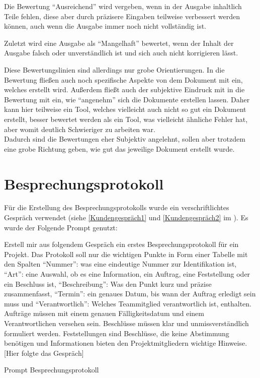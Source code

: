 Die Bewertung ``Ausreichend'' wird vergeben, wenn in der Ausgabe inhaltlich Teile fehlen, diese aber durch präzisere Eingaben 
teilweise verbessert werden können, auch wenn die Ausgabe immer noch nicht vollständig ist.

Zuletzt wird eine Ausgabe als ``Mangelhaft'' bewertet, wenn der Inhalt der Ausgabe falsch oder unverständlich ist und sich 
auch nicht korrigieren lässt.

Diese Bewertungslinien sind allerdings nur grobe Orientierungen. In die Bewertung fließen auch noch spezifische 
Aspekte von dem Dokument mit ein, welches erstellt wird. Außerdem fließt auch der subjektive Eindruck mit in die 
Bewertung mit ein, wie ``angenehm'' sich die Dokumente erstellen lassen. Daher kann hier teilweise ein Tool, welches 
vielleicht auch nicht so gut ein Dokument erstellt, besser bewertet werden als ein Tool, was vielleicht ähnliche 
Fehler hat, aber womit deutlich Schwieriger zu arbeiten war.\\
Dadurch sind die Bewertungen eher Subjektiv angelehnt, sollen aber trotzdem eine grobe Richtung geben, wie gut das 
jeweilige Dokument erstellt wurde.


\section{Besprechungsprotokoll}  \label{CompBesprechungsprotokoll}

Für die Erstellung des Besprechungsprotokolls wurde ein verschriftlichtes Gespräch verwendet 
(siehe \autoref{Kundengespräch1} und \autoref{Kundengespräch2} im ). Es wurde der Folgende Prompt 
genutzt:

\begin{prompt}[H]
    \begin{tcolorbox}[colback=gray!20, colframe=gray!20, boxrule=0pt, sharp corners] 
        Erstell mir aus folgendem Gespräch ein erstes Besprechungsprotokoll für ein Projekt. Das Protokoll soll nur 
        die wichtigen Punkte in Form einer Tabelle mit den Spalten ``Nummer'': was eine eindeutige Nummer zur 
        Identifikation ist, ``Art'': eine Auswahl, ob es eine Information, ein Auftrag, eine Feststellung oder ein 
        Beschluss ist, ``Beschreibung'': Was den Punkt kurz und präzise zusammenfasst, ``Termin'': ein genaues Datum, bis 
        wann der Auftrag erledigt sein muss und ``Verantwortlich'': Welches Teammitglied verantwortlich ist, enthalten. 
        Aufträge müssen mit einem genauen Fälligkeitsdatum und einem Verantwortlichen versehen sein. Beschlüsse 
        müssen klar und unmissverständlich formuliert werden. Feststellungen sind Beschlüsse, die keine Abstimmung 
        benötigen und Informationen bieten den Projektmitgliedern wichtige Hinweise. 
        [Hier folgte das Gespräch]
        \vfill
    \end{tcolorbox}
    \caption{Prompt Besprechungsprotokoll}
    \label{Prompt Besprechungsprotokoll}
\end{prompt}

